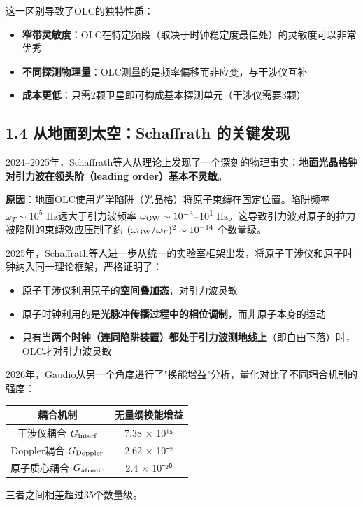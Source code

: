 \documentclass[12pt,a4paper]{article}
\begin{document}
这一区别导致了OLC的独特性质：
\begin{itemize}
  \item \textbf{窄带灵敏度}：OLC在特定频段（取决于时钟稳定度最佳处）的灵敏度可以非常优秀
  \item \textbf{不同探测物理量}：OLC测量的是频率偏移而非应变，与干涉仪互补
  \item \textbf{成本更低}：只需2颗卫星即可构成基本探测单元（干涉仪需要3颗）

\end{itemize}
\subsection{1.4 从地面到太空：Schaffrath 的关键发现}


2024–2025年，Schaffrath等人从理论上发现了一个深刻的物理事实：\textbf{地面光晶格钟对引力波在领头阶（leading order）基本不灵敏}\cite{ref7}。

\textbf{原因}：地面OLC使用光学陷阱（光晶格）将原子束缚在固定位置。陷阱频率 $\omega_T \sim 10^5$ Hz远大于引力波频率 $\omega_{\rm GW} \sim 10^{-3}$–10\textsuperscript{1} Hz。这导致引力波对原子的拉力被陷阱的束缚效应压制了约 $(\omega_{\rm GW}/\omega_T)^2 \sim 10^{-14}$ 个数量级。

2025年，Schaffrath等人进一步从统一的实验室框架出发，将原子干涉仪和原子时钟纳入同一理论框架，严格证明了：
\begin{itemize}
  \item 原子干涉仪利用原子的\textbf{空间叠加态}，对引力波灵敏
  \item 原子时钟利用的是\textbf{光脉冲传播过程中的相位调制}，而非原子本身的运动
  \item 只有当\textbf{两个时钟（连同陷阱装置）都处于引力波测地线上}（即自由下落）时，OLC才对引力波灵敏\cite{ref7}
\end{itemize}

2026年，Gaudio从另一个角度进行了"换能增益"分析，量化对比了不同耦合机制的强度\cite{ref8}：

\begin{tabular}{|c|c|}
\hline
耦合机制 & 无量纲换能增益 \\
\hline
干涉仪耦合 $G_{\rm interf}$ & 7.38 × 10¹⁵ \\
Doppler耦合 $G_{\rm Doppler}$ & 2.62 × 10⁻² \\
原子质心耦合 $G_{\rm atomic}$ & 2.4 × 10⁻²⁰ \\
\hline
\end{tabular}


三者之间相差超过35个数量级。
\end{document}
